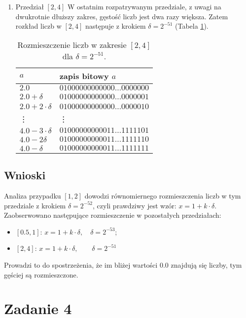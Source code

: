 \documentclass{classrep}
\begin{document}
\begin{enumerate}
		\item Przedział $[2,4]$
			\newline W ostatnim rozpatrywanym przedziale, z uwagi na dwukrotnie dłuższy zakres, gęstość liczb jest dwa razy większa.
   			Zatem rozkład liczb w $[2,4]$ następuje z krokiem $\delta = 2^{-51}$ (Tabela \ref{table:7}).
   			\begin{table}[!h]
        		\centering
        		\footnotesize
            	\begin{tabular}{ll} \toprule
                	$a$ & {zapis bitowy $a$} \\ \midrule
                		$2.0$ 			& $01000000000000\dots 0000000$ \\ 
 					$2.0+\delta$ 	& $01000000000000\dots 0000001$  \\
 					$2.0+2\cdot\delta$ & $01000000000000\dots 0000010$ \\
 					\vdots & \vdots \\
 					$4.0-3\cdot\delta$ & $01000000000011\dots 1111101$ \\
 					$4.0-2\delta$ & $01000000000011\dots 1111110$ \\
 					$4.0-\delta$ & $01000000000011\dots 1111111$ \\\bottomrule
            	\end{tabular}
            	\caption{Rozmieszczenie liczb w zakresie $[2,4]$ dla $\delta = 2^{-51}$.}
			\label{table:7}
   			\end{table}   			
		\end{enumerate}
	\subsection{Wnioski}
		Analiza przypadku $[1,2]$ dowodzi równomiernego rozmieszczenia liczb w tym przedziale z krokiem $\delta = 
		2^{-52}$, czyli prawdziwy jest wzór: $x=1+k\cdot\delta$. Zaobserwowano następujące rozmieszczenie w pozostałych 
		przedziałach:
		\begin{itemize}
			\item $[0.5,1]$: $x=1+k\cdot\delta, \quad \delta = 2^{-53}$;
			\item $[2,4]$: $x=1+k\cdot\delta, \qquad \delta = 2^{-51}$
		\end{itemize}
		Prowadzi to do spostrzeżenia, że im bliżej wartości $0.0$ znajdują się liczby, tym gęściej są rozmieszczone.
\section{Zadanie 4}
\end{document}
